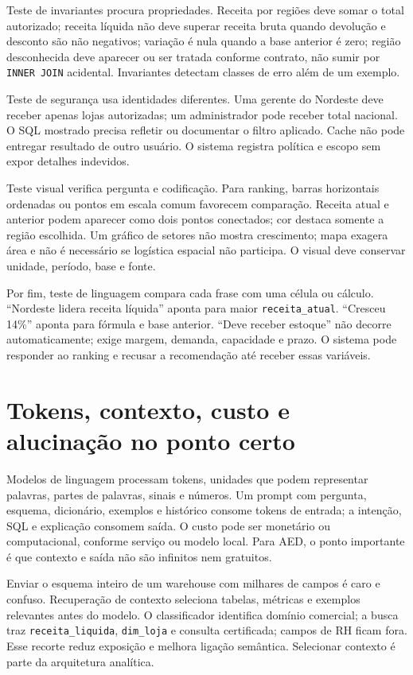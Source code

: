 Teste de invariantes procura propriedades. Receita por regiões deve somar o total autorizado; receita líquida não deve superar receita bruta quando devolução e desconto são não negativos; variação é nula quando a base anterior é zero; região desconhecida deve aparecer ou ser tratada conforme contrato, não sumir por \texttt{INNER JOIN} acidental. Invariantes detectam classes de erro além de um exemplo.

Teste de segurança usa identidades diferentes. Uma gerente do Nordeste deve receber apenas lojas autorizadas; um administrador pode receber total nacional. O SQL mostrado precisa refletir ou documentar o filtro aplicado. Cache não pode entregar resultado de outro usuário. O sistema registra política e escopo sem expor detalhes indevidos.

Teste visual verifica pergunta e codificação. Para ranking, barras horizontais ordenadas ou pontos em escala comum favorecem comparação. Receita atual e anterior podem aparecer como dois pontos conectados; cor destaca somente a região escolhida. Um gráfico de setores não mostra crescimento; mapa exagera área e não é necessário se logística espacial não participa. O visual deve conservar unidade, período, base e fonte.

Por fim, teste de linguagem compara cada frase com uma célula ou cálculo. ``Nordeste lidera receita líquida'' aponta para maior \texttt{receita\_atual}. ``Cresceu 14\%'' aponta para fórmula e base anterior. ``Deve receber estoque'' não decorre automaticamente; exige margem, demanda, capacidade e prazo. O sistema pode responder ao ranking e recusar a recomendação até receber essas variáveis.

\section{Tokens, contexto, custo e alucinação no ponto certo}

Modelos de linguagem processam tokens, unidades que podem representar palavras, partes de palavras, sinais e números. Um prompt com pergunta, esquema, dicionário, exemplos e histórico consome tokens de entrada; a intenção, SQL e explicação consomem saída. O custo pode ser monetário ou computacional, conforme serviço ou modelo local. Para AED, o ponto importante é que contexto e saída não são infinitos nem gratuitos.

Enviar o esquema inteiro de um warehouse com milhares de campos é caro e confuso. Recuperação de contexto seleciona tabelas, métricas e exemplos relevantes antes do modelo. O classificador identifica domínio comercial; a busca traz \texttt{receita\_liquida}, \texttt{dim\_loja} e consulta certificada; campos de RH ficam fora. Esse recorte reduz exposição e melhora ligação semântica. Selecionar contexto é parte da arquitetura analítica.


